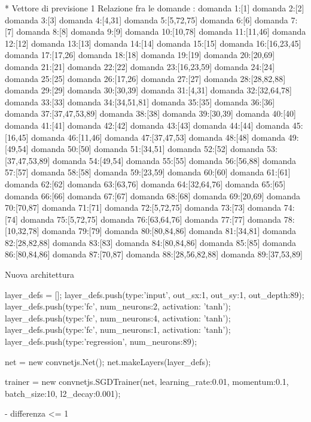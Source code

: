 * Vettore di previsione 1
Relazione fra le domande :
domanda 1:[1]
domanda 2:[2]
domanda 3:[3]
domanda 4:[4,31]
domanda 5:[5,72,75]
domanda 6:[6]
domanda 7:[7]
domanda 8:[8]
domanda 9:[9]
domanda 10:[10,78]
domanda 11:[11,46]
domanda 12:[12]
domanda 13:[13]
domanda 14:[14]
domanda 15:[15]
domanda 16:[16,23,45]
domanda 17:[17,26]
domanda 18:[18]
domanda 19:[19]
domanda 20:[20,69]
domanda 21:[21]
domanda 22:[22]
domanda 23:[16,23,59]
domanda 24:[24]
domanda 25:[25]
domanda 26:[17,26]
domanda 27:[27]
domanda 28:[28,82,88]
domanda 29:[29]
domanda 30:[30,39]
domanda 31:[4,31]
domanda 32:[32,64,78]
domanda 33:[33]
domanda 34:[34,51,81]
domanda 35:[35]
domanda 36:[36]
domanda 37:[37,47,53,89]
domanda 38:[38]
domanda 39:[30,39]
domanda 40:[40]
domanda 41:[41]
domanda 42:[42]
domanda 43:[43]
domanda 44:[44]
domanda 45:[16,45]
domanda 46:[11,46]
domanda 47:[37,47,53]
domanda 48:[48]
domanda 49:[49,54]
domanda 50:[50]
domanda 51:[34,51]
domanda 52:[52]
domanda 53:[37,47,53,89]
domanda 54:[49,54]
domanda 55:[55]
domanda 56:[56,88]
domanda 57:[57]
domanda 58:[58]
domanda 59:[23,59]
domanda 60:[60]
domanda 61:[61]
domanda 62:[62]
domanda 63:[63,76]
domanda 64:[32,64,76]
domanda 65:[65]
domanda 66:[66]
domanda 67:[67]
domanda 68:[68]
domanda 69:[20,69]
domanda 70:[70,87]
domanda 71:[71]
domanda 72:[5,72,75]
domanda 73:[73]
domanda 74:[74]
domanda 75:[5,72,75]
domanda 76:[63,64,76]
domanda 77:[77]
domanda 78:[10,32,78]
domanda 79:[79]
domanda 80:[80,84,86]
domanda 81:[34,81]
domanda 82:[28,82,88]
domanda 83:[83]
domanda 84:[80,84,86]
domanda 85:[85]
domanda 86:[80,84,86]
domanda 87:[70,87]
domanda 88:[28,56,82,88]
domanda 89:[37,53,89]



Nuova architettura



layer_defs = [];
layer_defs.push({type:'input', out_sx:1, out_sy:1, out_depth:89});
layer_defs.push({type:'fc', num_neurons:2, activation: 'tanh'});
layer_defs.push({type:'fc', num_neurons:4, activation: 'tanh'});
layer_defs.push({type:'fc', num_neurons:1, activation: 'tanh'});
layer_defs.push({type:'regression', num_neurons:89});

net = new convnetjs.Net();
net.makeLayers(layer_defs);

trainer = new convnetjs.SGDTrainer(net, {learning_rate:0.01, momentum:0.1, batch_size:10, l2_decay:0.001});

- differenza <= 1


